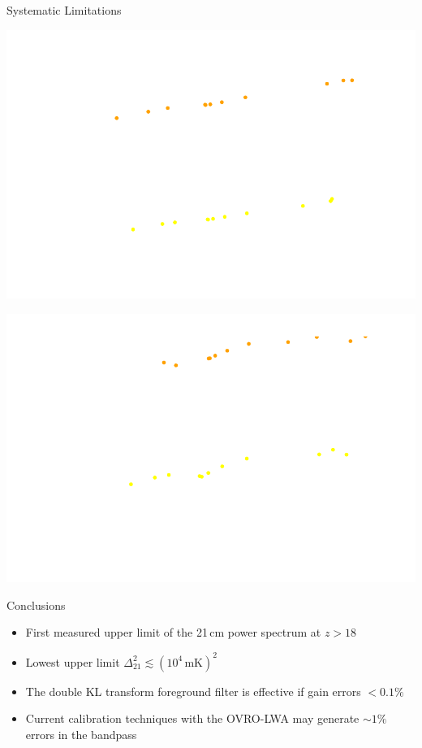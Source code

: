 \documentclass{beamer}
\begin{document}
\begin{frame}{Systematic Limitations}
    \begin{overprint}
        \begin{center}
            \includegraphics[height=0.75\textheight]{figures/spherical-power-spectra/spherical-power-spectrum-gain-errors.pdf}
        \end{center}
        \begin{center}
            \includegraphics[height=0.75\textheight]{figures/spherical-power-spectra/spherical-power-spectrum-bandpass-errors.pdf}
        \end{center}
    \end{overprint}
\end{frame}

\begin{frame}{Conclusions}
    \begin{itemize}[label=\textbullet]
        \item
            First measured upper limit of the 21\,cm power spectrum at $z > 18$
        \item
            Lowest upper limit $\Delta_{21}^2 \lesssim (10^4\,\textrm{mK})^2$
        \item
            The double KL transform foreground filter is effective if gain errors $<0.1\%$
        \item
            Current calibration techniques with the OVRO-LWA may generate $\sim 1\%$ errors in the
            bandpass
    \end{itemize}
\end{frame}
\end{document}
